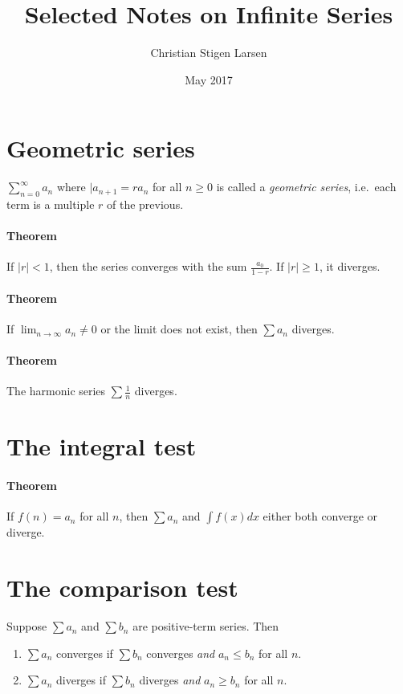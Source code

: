 \documentclass[a4paper,twocolumn,10pt]{article}
\title{Selected Notes on Infinite Series}
\author{Christian Stigen Larsen}
\date{May 2017}
\begin{document}
  \maketitle
  \section*{Geometric series}
  $\sum_{n=0}^{\infty} a_n$ where $|a_{n+1} = ra_n$ for all $n \geq 0$ is
  called a \textit{geometric series}, i.e.~each term is a multiple $r$ of the
  previous.

  \paragraph{Theorem} If $|r| < 1$, then the series converges with the sum
  $\frac{a_0}{1-r}$. If $|r| \geq 1$, it diverges.

  \paragraph{Theorem} If $\lim_{n\to\infty}{a_n}\neq 0$ or the limit does not
  exist, then $\sum a_n$ diverges.

  \paragraph{Theorem} The harmonic series $\sum \frac{1}{n}$ diverges.

  \section*{The integral test}

  \paragraph{Theorem} If $f(n) = a_n$ for all $n$, then $\sum a_n$ and $\int
  f(x) dx$ either both converge or diverge.

  \section*{The comparison test}
  Suppose $\sum a_n$ and $\sum b_n$ are positive-term series. Then
  \begin{enumerate}
    \item $\sum a_n$ converges if $\sum b_n$ converges \textit{and} $a_n \leq
      b_n$ for all $n$.
    \item $\sum a_n$ diverges if $\sum b_n$ diverges \textit{and} $a_n \geq
      b_n$ for all $n$.
  \end{enumerate}
\end{document}
